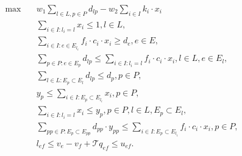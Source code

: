 \begin{align}
  \max\quad & w_{1} \sum_{l \in L, p \in P} d_{l p} - w_{2} \sum_{i \in I} k_{i} \cdot x_{i} \tag{eq\_0002} \\
  & \sum_{i \in I : l_{i} = l} x_{i} \leq 1 , l \in L , \tag{eq\_0003} \\
  & \underset{i \in I : e \in E_{l_{i}}}{\sum} f_{i} \cdot c_{i} \cdot x_{i} \geq d_{e} , e \in E , \tag{eq\_0004} \\
  & \sum_{p \in P : e \in E_{p}} d_{l p} \leq \sum_{i \in I : l_{i} = l} f_{i} \cdot c_{i} \cdot x_{i} , l \in L , e \in E_{l} , \tag{eq\_0005} \\
  & \sum_{l \in L : E_{p} \subset E_{l}} d_{l p} \leq d_{p} , p \in P , \tag{eq\_0006} \\
  & y_{p} \leq \underset{i \in I : E_{p} \subset E_{l_{i}}}{\sum} x_{i} , p \in P , \tag{eq\_0011} \\
  & \sum_{i \in I : l_{i} = l} x_{i} \leq y_{p} , p \in P , l \in L , E_{p} \subset E_{l} , \tag{eq\_0012} \\
  & \underset{pp \in P : E_{p} \subset E_{pp}}{\sum} d_{pp} \cdot y_{pp} \leq \underset{i \in I : E_{p} \subset E_{l_{i}}}{\sum} f_{i} \cdot c_{i} \cdot x_{i} , p \in P , \tag{eq\_0013} \\
  & l_{e f} \leq v_{e} - v_{f} + \mathcal{T} q_{e f} \leq u_{e f} . \tag{eq\_0023} \\
\end{align}
